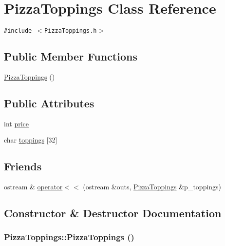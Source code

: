 \hypertarget{class_pizza_toppings}{
\section{Pizza\-Toppings Class Reference}
\label{class_pizza_toppings}
}
{\tt \#include $<$Pizza\-Toppings.h$>$}

\subsection*{Public Member Functions}
\begin{CompactItemize}
\item 
\hyperlink{class_pizza_toppings_1461dbf4163d60233bd968c435d85db9}{Pizza\-Toppings} ()
\end{CompactItemize}
\subsection*{Public Attributes}
\begin{CompactItemize}
\item 
int \hyperlink{class_pizza_toppings_78a5eb43deef9a7b5b9ce157b9d52ac4}{price}
\item 
char \hyperlink{class_pizza_toppings_d65a29390afb76fef45b1e9225e2b6ed}{toppings} \mbox{[}32\mbox{]}
\end{CompactItemize}
\subsection*{Friends}
\begin{CompactItemize}
\item 
ostream \& \hyperlink{class_pizza_toppings_d82a6ac0fb2196d7430f04944d9135d4}{operator$<$$<$} (ostream \&outs, \hyperlink{class_pizza_toppings}{Pizza\-Toppings} \&p\_\-toppings)
\end{CompactItemize}


\subsection{Constructor \& Destructor Documentation}
\hypertarget{class_pizza_toppings_1461dbf4163d60233bd968c435d85db9}{
\subsubsection[PizzaToppings]{\setlength{\rightskip}{0pt plus 5cm}Pizza\-Toppings::Pizza\-Toppings ()}}
\label{class_pizza_toppings_1461dbf4163d60233bd968c435d85db9}




